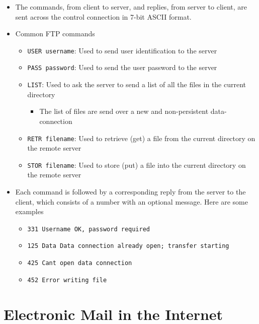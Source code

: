 \documentclass[11pt]{article}
\providecommand{\tightlist}{%
      \setlength{\itemsep}{0pt}\setlength{\parskip}{0pt}}
\begin{document}
\begin{itemize}
\tightlist
\item
  The commands, from client to server, and replies, from server to
  client, are sent across the control connection in 7-bit ASCII format.
\item
  Common FTP commands

  \begin{itemize}
  \tightlist
  \item
    \texttt{USER\ username}: Used to send user identification to the
    server
  \item
    \texttt{PASS\ password}: Used to send the user password to the
    server
  \item
    \texttt{LIST}: Used to ask the server to send a list of all the
    files in the current directory

    \begin{itemize}
    \tightlist
    \item
      The list of files are send over a new and non-persistent
      data-connection
    \end{itemize}
  \item
    \texttt{RETR\ filename}: Used to retrieve (get) a file from the
    current directory on the remote server
  \item
    \texttt{STOR\ filename}: Used to store (put) a file into the current
    directory on the remote server
  \end{itemize}
\item
  Each command is followed by a corresponding reply from the server to
  the client, which consists of a number with an optional message. Here
  are some examples

  \begin{itemize}
  \tightlist
  \item
    \texttt{331\ Username\ OK,\ password\ required}
  \item
    \texttt{125\ Data\ Data\ connection\ already\ open;\ transfer\ starting}
  \item
    \texttt{425\ Can\textquotesingle{}t\ open\ data\ connection}
  \item
    \texttt{452\ Error\ writing\ file}
  \end{itemize}
\end{itemize}

    \section{Electronic Mail in the
Internet}\label{electronic-mail-in-the-internet}
\end{document}
